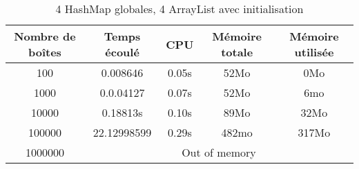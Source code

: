 \begin{table}[h]
  \centering
\begin{tabular}{|c|c|c|c|c|}
\hline
Nombre de boîtes & Temps écoulé & CPU & Mémoire totale & Mémoire utilisée\\
\hline
100 & 0.008646 & 0.05s & 52Mo & 0Mo\\
\hline
1000 & 0.0.04127 & 0.07s & 52Mo & 6mo\\
\hline
10000 & 0.18813s & 0.10s & 89Mo & 32Mo\\
\hline
100000 & 22.12998599 & 0.29s & 482mo & 317Mo\\
\hline
1000000 & \multicolumn{4}{|c|}{Out of memory}\\
\hline
\end{tabular}
\caption{4 HashMap globales, 4 ArrayList avec initialisation}
\end{table}
